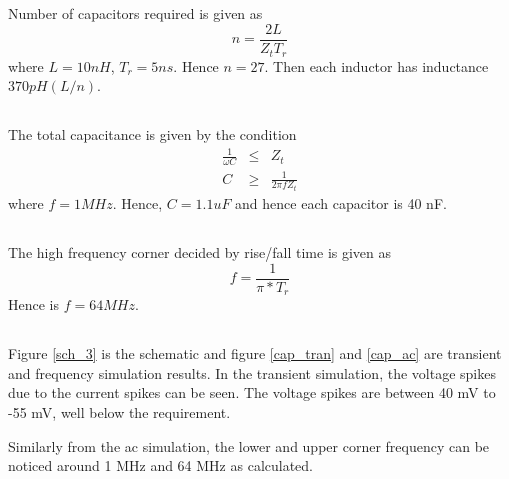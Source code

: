 \documentclass[12pt,a4paper,UKenglish]{article}
\begin{document}
\subsection{}
Number of capacitors required is given as
\begin{equation*}
n =  \frac{2L}{Z_tT_r}
\end{equation*}
where $L = 10nH$, $T_r = 5 ns$. Hence $n = 27$. Then each inductor has inductance  $370 pH (L/n)$.
\subsection{}
The total capacitance is given by the condition
\begin{eqnarray*}
\frac{1}{\omega C}& \leq & Z_t  \\
C  &  \geq&\frac{1}{2\pi f Z_t}
\end{eqnarray*}
where $f=1 MHz$. Hence, $ C = 1.1 uF$ and hence each capacitor is 40 nF.
\subsection{}
The high frequency corner decided by rise/fall time is given as 
\begin{equation*}
f = \frac{1}{\pi*T_r}
\end{equation*}
Hence is $f=64 MHz$.
\subsection{}
Figure \ref{sch_3} is the schematic and figure  \ref{cap_tran} and  \ref{cap_ac}  are transient and frequency simulation results. In the transient simulation, the voltage spikes due to the current spikes can be seen. The voltage spikes are between 40 mV to -55 mV,  well below the requirement.

Similarly from the ac simulation, the lower and upper corner frequency can be noticed around 1 MHz and 64 MHz as calculated.
\end{document}
